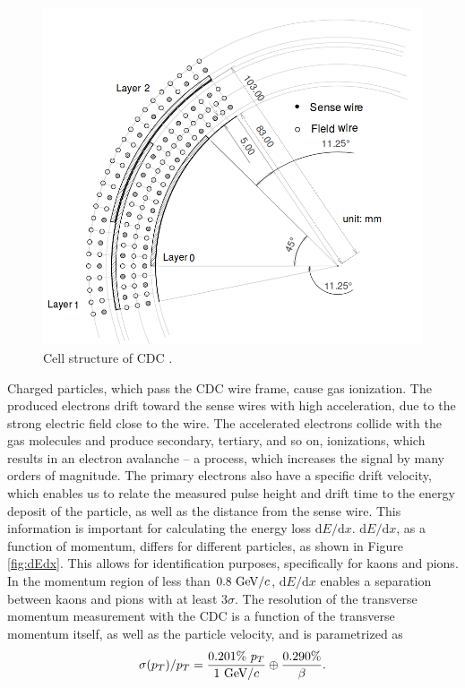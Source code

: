 \begin{figure}[H]
	\centering
	\captionsetup{width=0.8\linewidth}
	\includegraphics[width=0.6\linewidth]{fig/setup/CDC_layout}
	\caption{Cell structure of CDC \cite{ABASHIAN2002117}.}
	\label{fig:CDC_layout}
\end{figure}

Charged particles, which pass the CDC wire frame, cause gas ionization. The produced electrons drift toward the sense wires with high acceleration, due to the strong electric field close to the wire. The accelerated electrons collide with the gas molecules and produce secondary, tertiary, and so on, ionizations, which results in an electron avalanche -- a process, which increases the signal by many orders of magnitude. The primary electrons also have a specific drift velocity, which enables us to relate the measured pulse height and drift time to the energy deposit of the particle, as well as the distance from the sense wire. This information is important for calculating the energy loss $\mathrm{d}E/\mathrm{d}x$. $\mathrm{d}E/\mathrm{d}x$, as a function of momentum, differs for different particles, as shown in Figure \ref{fig:dEdx}. This allows for identification purposes, specifically for kaons and pions. In the momentum region of less than $0.8\mathrm{~GeV}/c$, $\mathrm{d}E/\mathrm{d}x$ enables a separation between kaons and pions with at least $3\sigma$. The resolution of the transverse momentum measurement with the CDC is a function of the transverse momentum itself, as well as the particle velocity, and is parametrized as
\begin{equation}
\sigma(p_T)/p_T = \frac{0.201\%~p_T}{1\mathrm{~GeV}/c} \oplus \frac{0.290\%}{\beta}.
\end{equation}

